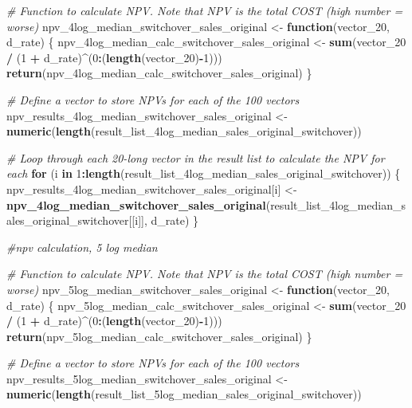 \documentclass[
]{article}
\newenvironment{Shaded}{\begin{snugshade}}{\end{snugshade}}
\newcommand{\CommentTok}[1]{\textcolor[rgb]{0.56,0.35,0.01}{\textit{#1}}}
\newcommand{\ControlFlowTok}[1]{\textcolor[rgb]{0.13,0.29,0.53}{\textbf{#1}}}
\newcommand{\DecValTok}[1]{\textcolor[rgb]{0.00,0.00,0.81}{#1}}
\newcommand{\FunctionTok}[1]{\textcolor[rgb]{0.13,0.29,0.53}{\textbf{#1}}}
\newcommand{\NormalTok}[1]{#1}
\newcommand{\OtherTok}[1]{\textcolor[rgb]{0.56,0.35,0.01}{#1}}
\newcommand{\SpecialCharTok}[1]{\textcolor[rgb]{0.81,0.36,0.00}{\textbf{#1}}}
\begin{document}
\begin{Shaded}
\begin{Highlighting}[]
\CommentTok{\# Function to calculate NPV. Note that NPV is the total COST (high number = worse)}
\NormalTok{npv\_4log\_median\_switchover\_sales\_original }\OtherTok{\textless{}{-}} \ControlFlowTok{function}\NormalTok{(vector\_20, d\_rate) \{}
\NormalTok{  npv\_4log\_median\_calc\_switchover\_sales\_original }\OtherTok{\textless{}{-}} \FunctionTok{sum}\NormalTok{(vector\_20 }\SpecialCharTok{/}\NormalTok{ (}\DecValTok{1} \SpecialCharTok{+}\NormalTok{ d\_rate)}\SpecialCharTok{\^{}}\NormalTok{(}\DecValTok{0}\SpecialCharTok{:}\NormalTok{(}\FunctionTok{length}\NormalTok{(vector\_20)}\SpecialCharTok{{-}}\DecValTok{1}\NormalTok{)))}
  \FunctionTok{return}\NormalTok{(npv\_4log\_median\_calc\_switchover\_sales\_original)}
\NormalTok{\}}

\CommentTok{\# Define a vector to store NPVs for each of the 100 vectors}
\NormalTok{npv\_results\_4log\_median\_switchover\_sales\_original }\OtherTok{\textless{}{-}} \FunctionTok{numeric}\NormalTok{(}\FunctionTok{length}\NormalTok{(result\_list\_4log\_median\_sales\_original\_switchover))}

\CommentTok{\# Loop through each 20{-}long vector in the result list to calculate the NPV for each}
\ControlFlowTok{for}\NormalTok{ (i }\ControlFlowTok{in} \DecValTok{1}\SpecialCharTok{:}\FunctionTok{length}\NormalTok{(result\_list\_4log\_median\_sales\_original\_switchover)) \{}
\NormalTok{  npv\_results\_4log\_median\_switchover\_sales\_original[i] }\OtherTok{\textless{}{-}} \FunctionTok{npv\_4log\_median\_switchover\_sales\_original}\NormalTok{(result\_list\_4log\_median\_sales\_original\_switchover[[i]], d\_rate)}
\NormalTok{\}}


\CommentTok{\#npv calculation, 5 log median}


\CommentTok{\# Function to calculate NPV. Note that NPV is the total COST (high number = worse)}
\NormalTok{npv\_5log\_median\_switchover\_sales\_original }\OtherTok{\textless{}{-}} \ControlFlowTok{function}\NormalTok{(vector\_20, d\_rate) \{}
\NormalTok{  npv\_5log\_median\_calc\_switchover\_sales\_original }\OtherTok{\textless{}{-}} \FunctionTok{sum}\NormalTok{(vector\_20 }\SpecialCharTok{/}\NormalTok{ (}\DecValTok{1} \SpecialCharTok{+}\NormalTok{ d\_rate)}\SpecialCharTok{\^{}}\NormalTok{(}\DecValTok{0}\SpecialCharTok{:}\NormalTok{(}\FunctionTok{length}\NormalTok{(vector\_20)}\SpecialCharTok{{-}}\DecValTok{1}\NormalTok{)))}
  \FunctionTok{return}\NormalTok{(npv\_5log\_median\_calc\_switchover\_sales\_original)}
\NormalTok{\}}

\CommentTok{\# Define a vector to store NPVs for each of the 100 vectors}
\NormalTok{npv\_results\_5log\_median\_switchover\_sales\_original }\OtherTok{\textless{}{-}} \FunctionTok{numeric}\NormalTok{(}\FunctionTok{length}\NormalTok{(result\_list\_5log\_median\_sales\_original\_switchover))}


\end{Highlighting}
\end{Shaded}
\end{document}
